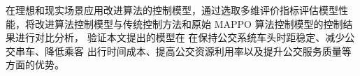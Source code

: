 在理想和现实场景应用改进算法的控制模型，通过选取多维评价指标评估模型性能，将改进算法控制模型与传统控制方法和原始 
MAPPO 算法控制模型的控制结果进行对比分析，
验证本文提出的模型在
在保持公交系统车头时距稳定、减少公交串车、降低乘客
出行时间成本、提高公交资源利用率以及提升公交服务质量等方面的优势。










